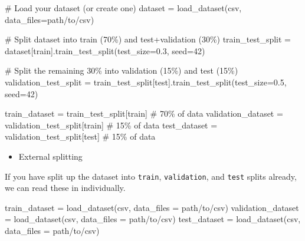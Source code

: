 \documentclass[
  letterpaper,
  DIV=11,
  numbers=noendperiod]{scrreprt}
\newenvironment{Shaded}{\begin{snugshade}}{\end{snugshade}}
\newcommand{\CommentTok}[1]{\textcolor[rgb]{0.37,0.37,0.37}{#1}}
\newcommand{\DecValTok}[1]{\textcolor[rgb]{0.68,0.00,0.00}{#1}}
\newcommand{\FloatTok}[1]{\textcolor[rgb]{0.68,0.00,0.00}{#1}}
\newcommand{\NormalTok}[1]{\textcolor[rgb]{0.00,0.23,0.31}{#1}}
\newcommand{\OperatorTok}[1]{\textcolor[rgb]{0.37,0.37,0.37}{#1}}
\newcommand{\StringTok}[1]{\textcolor[rgb]{0.13,0.47,0.30}{#1}}
\providecommand{\tightlist}{%
  \setlength{\itemsep}{0pt}\setlength{\parskip}{0pt}}\usepackage{longtable,booktabs,array}
\begin{document}
\begin{Shaded}
\begin{Highlighting}[]
\CommentTok{\# Load your dataset (or create one)}
\NormalTok{dataset }\OperatorTok{=}\NormalTok{ load\_dataset(}\StringTok{\textquotesingle{}csv\textquotesingle{}}\NormalTok{, data\_files}\OperatorTok{=}\NormalTok{path}\OperatorTok{/}\NormalTok{to}\OperatorTok{/}\NormalTok{csv)}

\CommentTok{\# Split dataset into train (70\%) and test+validation (30\%)}
\NormalTok{train\_test\_split }\OperatorTok{=}\NormalTok{ dataset[}\StringTok{\textquotesingle{}train\textquotesingle{}}\NormalTok{].train\_test\_split(test\_size}\OperatorTok{=}\FloatTok{0.3}\NormalTok{, seed}\OperatorTok{=}\DecValTok{42}\NormalTok{)}

\CommentTok{\# Split the remaining 30\% into validation (15\%) and test (15\%)}
\NormalTok{validation\_test\_split }\OperatorTok{=}\NormalTok{ train\_test\_split[}\StringTok{\textquotesingle{}test\textquotesingle{}}\NormalTok{].train\_test\_split(test\_size}\OperatorTok{=}\FloatTok{0.5}\NormalTok{, seed}\OperatorTok{=}\DecValTok{42}\NormalTok{)}

\NormalTok{train\_dataset }\OperatorTok{=}\NormalTok{ train\_test\_split[}\StringTok{\textquotesingle{}train\textquotesingle{}}\NormalTok{] }\CommentTok{\# 70\% of data}
\NormalTok{validation\_dataset }\OperatorTok{=}\NormalTok{ validation\_test\_split[}\StringTok{\textquotesingle{}train\textquotesingle{}}\NormalTok{] }\CommentTok{\# 15\% of data}
\NormalTok{test\_dataset }\OperatorTok{=}\NormalTok{ validation\_test\_split[}\StringTok{\textquotesingle{}test\textquotesingle{}}\NormalTok{] }\CommentTok{\# 15\% of data}
\end{Highlighting}
\end{Shaded}

\begin{itemize}
\tightlist
\item
  External splitting
\end{itemize}

If you have split up the dataset into \texttt{train},
\texttt{validation}, and \texttt{test} splits already, we can read these
in individually.

\begin{Shaded}
\begin{Highlighting}[]
\NormalTok{train\_dataset }\OperatorTok{=}\NormalTok{ load\_dataset(}\StringTok{\textquotesingle{}csv\textquotesingle{}}\NormalTok{, data\_files }\OperatorTok{=}\NormalTok{ path}\OperatorTok{/}\NormalTok{to}\OperatorTok{/}\NormalTok{csv)}
\NormalTok{validation\_dataset }\OperatorTok{=}\NormalTok{ load\_dataset(}\StringTok{\textquotesingle{}csv\textquotesingle{}}\NormalTok{, data\_files }\OperatorTok{=}\NormalTok{ path}\OperatorTok{/}\NormalTok{to}\OperatorTok{/}\NormalTok{csv)}
\NormalTok{test\_dataset }\OperatorTok{=}\NormalTok{ load\_dataset(}\StringTok{\textquotesingle{}csv\textquotesingle{}}\NormalTok{, data\_files }\OperatorTok{=}\NormalTok{ path}\OperatorTok{/}\NormalTok{to}\OperatorTok{/}\NormalTok{csv)}
\end{Highlighting}
\end{Shaded}
\end{document}
